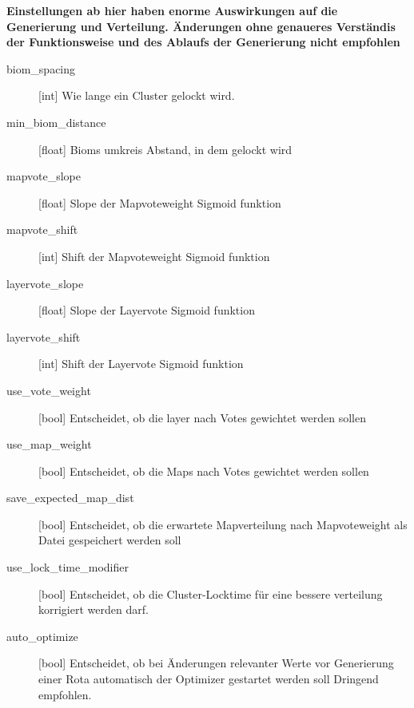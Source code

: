 \newpage
\textbf{Einstellungen ab hier haben enorme Auswirkungen auf die Generierung und Verteilung.
Änderungen ohne genaueres Verständis der Funktionsweise und des Ablaufs der Generierung nicht empfohlen}
\begin{description}
    \item[biom\_spacing][int] \newline
        Wie lange ein Cluster gelockt wird.
    \item[min\_biom\_distance][float] \newline
        Bioms umkreis Abstand, in dem gelockt wird
    \item[mapvote\_slope][float] \newline
        Slope der Mapvoteweight Sigmoid funktion
    \item[mapvote\_shift][int] \newline
        Shift der Mapvoteweight Sigmoid funktion
    \item[layervote\_slope][float] \newline
        Slope der Layervote Sigmoid funktion
    \item[layervote\_shift][int] \newline
        Shift der Layervote Sigmoid funktion
    \item[use\_vote\_weight][bool] \newline
        Entscheidet, ob die layer nach Votes gewichtet werden sollen 
    \item[use\_map\_weight][bool] \newline
        Entscheidet, ob die Maps nach Votes gewichtet werden sollen
    \item[save\_expected\_map\_dist][bool] \newline
        Entscheidet, ob die erwartete Mapverteilung nach Mapvoteweight als Datei gespeichert werden soll
    \item[use\_lock\_time\_modifier][bool] \newline
        Entscheidet, ob die Cluster-Locktime für eine bessere verteilung korrigiert werden darf.
    \item[auto\_optimize][bool] \newline
        Entscheidet, ob bei Änderungen relevanter Werte vor Generierung einer Rota automatisch der Optimizer gestartet werden soll
        Dringend empfohlen.
\end{description}
